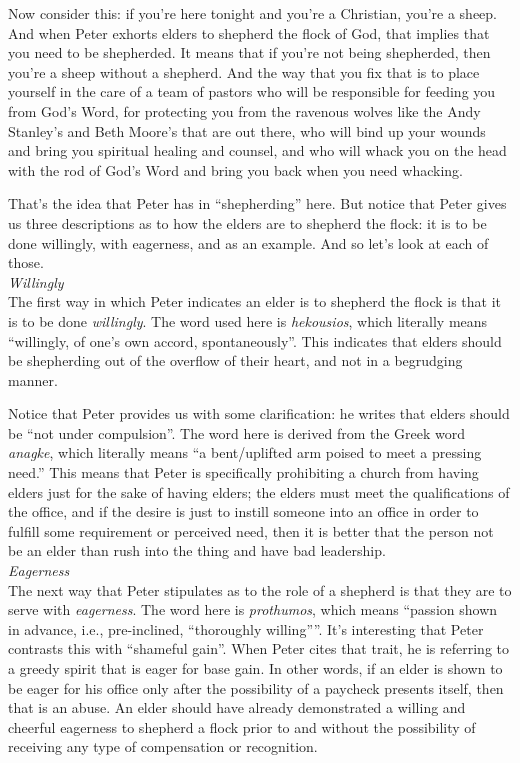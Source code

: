 \documentclass[letterpaper, 12pt]{article}
\begin{document}
    Now consider this: if you're here tonight and you're a Christian,
    you're a sheep. And when Peter exhorts elders to shepherd the flock
    of God, that implies that you need to be shepherded. It means that
    if you're not being shepherded, then you're a sheep without a
    shepherd.  And the way that you fix that is to place yourself in the
    care of a team of pastors who will be responsible for feeding you
    from God's Word, for protecting you from the ravenous wolves like
    the Andy Stanley's and Beth Moore's that are out there, who will
    bind up your wounds and bring you spiritual healing and counsel, and
    who will whack you on the head with the rod of God's Word and bring
    you back when you need whacking.

    That's the idea that Peter has in ``shepherding'' here. But notice
    that Peter gives us three descriptions as to how the elders are to
    shepherd the flock: it is to be done willingly, with eagerness, and
    as an example. And so let's look at each of those. \\

    \noindent \emph{Willingly} \\

    The first way in which Peter indicates an elder is to shepherd the
    flock is that it is to be done \emph{willingly}.  The word used here
    is \emph{hekousios}, which literally means ``willingly, of one's own
    accord, spontaneously''.  This indicates that elders should be
    shepherding out of the overflow of their heart, and not in a
    begrudging manner.

    Notice that Peter provides us with some clarification: he writes
    that elders should be ``not under compulsion''.  The word here is
    derived from the Greek word \emph{anagke}, which literally means ``a
    bent/uplifted arm poised to meet a pressing need.''  This means that
    Peter is specifically prohibiting a church from having elders just
    for the sake of having elders; the elders must meet the
    qualifications of the office, and if the desire is just to instill
    someone into an office in order to fulfill some requirement or
    perceived need, then it is better that the person not be an elder
    than rush into the thing and have bad leadership. \\

    \noindent \emph{Eagerness} \\

    The next way that Peter stipulates as to the role of a shepherd is
    that they are to serve with \emph{eagerness}.  The word here is
    \emph{prothumos}, which means ``passion shown in advance, i.e.,
    pre-inclined, ``thoroughly willing''''.  It's interesting that Peter
    contrasts this with ``shameful gain''.  When Peter cites that trait,
    he is referring to a greedy spirit that is eager for base gain.  In
    other words, if an elder is shown to be eager for his office only
    after the possibility of a paycheck presents itself, then that is an
    abuse.  An elder should have already demonstrated a willing and
    cheerful eagerness to shepherd a flock prior to and without the
    possibility of receiving any type of compensation or recognition. \\
\end{document}
